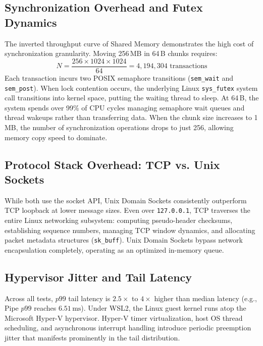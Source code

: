 \documentclass[conference]{IEEEtran}
\begin{document}
\subsection{Synchronization Overhead and Futex Dynamics}
The inverted throughput curve of Shared Memory demonstrates the high cost of synchronization granularity. Moving 256\,MB in 64\,B chunks requires:
\begin{equation}
N = \frac{256 \times 1024 \times 1024}{64} = 4{,}194{,}304 \text{ transactions}
\end{equation}
Each transaction incurs two POSIX semaphore transitions (\texttt{sem\_wait} and \texttt{sem\_post}). When lock contention occurs, the underlying Linux \texttt{sys\_futex} system call transitions into kernel space, putting the waiting thread to sleep. At 64\,B, the system spends over 99\% of CPU cycles managing semaphore wait queues and thread wakeups rather than transferring data. When the chunk size increases to 1\,MB, the number of synchronization operations drops to just 256, allowing memory copy speed to dominate.

\subsection{Protocol Stack Overhead: TCP vs. Unix Sockets}
While both use the socket API, Unix Domain Sockets consistently outperform TCP loopback at lower message sizes. Even over \texttt{127.0.0.1}, TCP traverses the entire Linux networking subsystem: computing pseudo-header checksums, establishing sequence numbers, managing TCP window dynamics, and allocating packet metadata structures (\texttt{sk\_buff}). Unix Domain Sockets bypass network encapsulation completely, operating as an optimized in-memory queue.

\subsection{Hypervisor Jitter and Tail Latency}
Across all tests, $p99$ tail latency is $2.5\times$ to $4\times$ higher than median latency (e.g., Pipe $p99$ reaches $6.51\,\text{ms}$). Under WSL2, the Linux guest kernel runs atop the Microsoft Hyper-V hypervisor. Hyper-V timer virtualization, host OS thread scheduling, and asynchronous interrupt handling introduce periodic preemption jitter that manifests prominently in the tail distribution.
\end{document}
